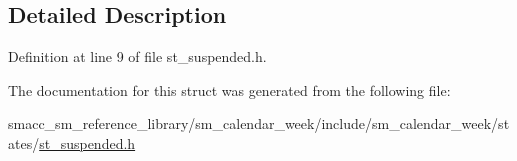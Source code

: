 \subsection{Detailed Description}


Definition at line 9 of file st\+\_\+suspended.\+h.



The documentation for this struct was generated from the following file\+:\begin{DoxyCompactItemize}
\item 
smacc\+\_\+sm\+\_\+reference\+\_\+library/sm\+\_\+calendar\+\_\+week/include/sm\+\_\+calendar\+\_\+week/states/\hyperlink{sm__calendar__week_2include_2sm__calendar__week_2states_2st__suspended_8h}{st\+\_\+suspended.\+h}\end{DoxyCompactItemize}
